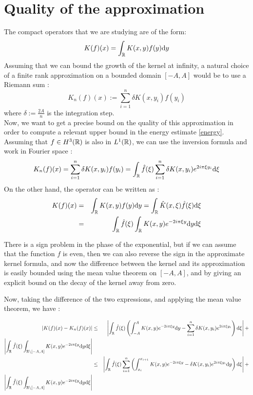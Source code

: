 \documentclass[11pt,a4paper]{article}
\begin{document}
\newpage

\section{Quality of the approximation}
The compact operators that we are studying are of the form: \[K(f)(x) = \int_\mathbb R K(x,y)f(y)\mathrm{d}y \]
Assuming that we can bound the growth of the kernel at infinity, a natural choice of a finite rank approximation on a bounded domain $[-A,A]$ would be to use a Riemann sum : \[K_n(f)(x) := \sum_{i=1}^n \delta K(x,y_i)f(y_i)\]
where $\delta := \frac{2A}{n}$ is the integration step. \\

Now, we want to get a precise bound on the quality of this approximation in order to compute a relevant upper bound in the energy estimate \ref{energy}. \\
Assuming that $f\in H^3(\mathbb R)$ is also in $L^1(\mathbb R)$, we can use the inversion formula and work in Fourier space :
\begin{equation}\label{int_finite}
K_n(f)(x) =  \sum_{i=1}^n\delta K(x,y_i)f(y_i) = \int_\mathbb R \hat{f}(\xi)\sum_{i=1}^n \delta K(x,y_i) e^{2i\pi\xi y_i}\mathrm{d}\xi
\end{equation}
On the other hand, the operator can be written as :
\begin{eqnarray*}
K(f)(x) &=& \int_\mathbb R K(x,y)f(y)\mathrm{d}y = \int_\mathbb R \hat{K}(x,\xi)\hat{f}(\xi)\mathrm{d}\xi \\
&=& \int_\mathbb R \hat{f}(\xi) \int_\mathbb R K(x,y)e^{-2i\pi\xi y}\mathrm{d}y \mathrm{d}\xi 
\end{eqnarray*}

There is a sign problem in the phase of the exponential, but if we can assume that the function $f$ is even, then we can also reverse the sign in the approximate kernel formula, and now the difference between the kernel and its approximation is easily bounded using the mean value theorem on $[-A,A]$, and by giving an explicit bound on the decay of the kernel away from zero. 

Now, taking the difference of the two expressions, and applying the mean value theorem, we have :

\begin{eqnarray*}
\left| K(f)(x) - K_n(f)(x)\right| &\leq& \left|  \int_\R \hat{f}(\xi) \left(\int_{-A}^A K(x,y)e^{-2i\pi\xi y}\mathrm{d}y - \sum_{i=1}^n \delta K(x,y_i) e^{2i\pi\xi y_i} \right)\mathrm{d}\xi \right| + \\ \left|  \int_\R \hat{f}(\xi) \int_{\R \setminus [-A,A]} K(x,y)e^{-2i\pi\xi y}\mathrm{d}y\mathrm{d}\xi \right| \\
&\leq&  \left|  \int_\R \hat{f}(\xi)  \sum_{i=1}^n \left(\int_{x_i}^{x_{i+1}} K(x,y)e^{-2i\pi\xi y} - \delta K(x,y_i) e^{2i\pi\xi y_i}\mathrm{d}y \right)\mathrm{d}\xi \right| + \\ \left|  \int_\R \hat{f}(\xi) \int_{\R \setminus [-A,A]} K(x,y)e^{-2i\pi\xi y}\mathrm{d}y\mathrm{d}\xi \right| 

\end{eqnarray*}
\end{document}
